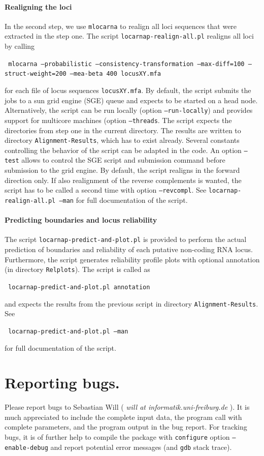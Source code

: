 \documentclass{article}
\newenvironment{ttbox}{%
  \begin{framed}\begin{minipage}{1.0\textwidth}\tt}%
{\end{minipage}\end{framed}\noindent}
\begin{document}
\paragraph{Realigning the loci} 
In the second step, we use \texttt{mlocarna} to realign all loci
sequences that were extracted in the step one. The script
\texttt{locarnap-realign-all.pl} realigns all loci by calling
\begin{ttbox}
  mlocarna --probabilistic --consistency-transformation --max-diff=100 --struct-weight=200 --mea-beta 400 locusXY.mfa
\end{ttbox}
for each file of locus sequences \texttt{locusXY.mfa}. By default, the
script submits the jobs to a sun grid engine (SGE) queue and expects
to be started on a head node. Alternatively, the script can be run
locally (option \texttt{--run-locally}) and provides support for
multicore machines (option \texttt{--threads}. The script expects the
directories from step one in the current directory. The results are
written to directory \texttt{Alignment-Results}, which has to exist
already. Several constants controlling the behavior of the script can
be adapted in the code. An option \texttt{--test} allows to control
the SGE script and submission command before submission to the grid
engine. By default, the script realigns in the forward direction
only. If also realignment of the reverse complements is wanted, the
script has to be called a second time with option \texttt{--revcompl}.
See \texttt{locarnap-realign-all.pl --man} for full documentation of
the script.

\paragraph{Predicting boundaries and locus reliability}
The script \texttt{locarnap-predict-and-plot.pl} is provided to perform the
actual prediction of boundaries and reliability of each putative
non-coding RNA locus. Furthermore, the script generates reliability
profile plots with optional annotation (in directory
\texttt{Relplots}). The script is called as
\begin{ttbox}
  locarnap-predict-and-plot.pl annotation
\end{ttbox}
and expects the results from the previous script in directory
\texttt{Alignment-Results}.  See 
\begin{ttbox}
  locarnap-predict-and-plot.pl --man
\end{ttbox}
for full documentation of the script.

\section{Reporting bugs.}

Please report bugs to Sebastian Will ( \emph{will at
  informatik.uni-freiburg.de} ). It is much appreciated to include the
complete input data, the program call with complete parameters, and
the program output in the bug report. For tracking bugs, it is of
further help to compile the package with \texttt{configure} option
\texttt{--enable-debug} and report potential error messages (and
\texttt{gdb} stack trace).



\end{document}
